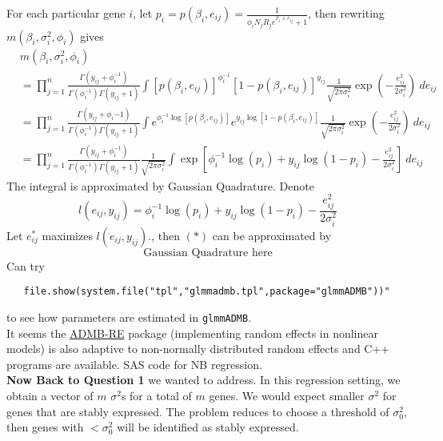 \documentclass[paper=a4, fontsize=12.5pt]{scrartcl} %
\numberwithin{equation}{section} %
\numberwithin{figure}{section} %
\numberwithin{table}{section} %
\begin{document}
   For each particular gene $i$, let $p_{i} = p(\beta_i, e_{ij}) =\frac{1}{\phi_i N_jR_je^{\beta_i  + e_{ij}} + 1}$, then rewriting $m(\beta_i, \sigma^2_i, \phi_i)$ gives 
\begin{align*}
  & m(\beta_i, \sigma^2_i, \phi_i) \\
   &= \prod_{j=1}^n\frac{\Gamma(y_{ij}+ \phi_i^{-1})}{\Gamma(\phi_i^{-1})\Gamma(y_{ij} + 1)}\int [p(\beta_i, e_{ij})]^{\phi_i^{-1}}[1-p(\beta_i, e_{ij})]^{y_{ij}}\frac{1}{\sqrt{2\pi\sigma^2_i}}\exp\left(-\frac{e_{ij}^2}{2\sigma_i^2}\right)~de_{ij}  \\
   &= \prod_{j=1}^n\frac{\Gamma(y_{ij}+ \phi_i{-1})}{\Gamma(\phi_i^{-1})\Gamma(y_{ij} + 1)}\int e^{\phi_i^{-1}\log[p(\beta_i,e_{ij})]}e^{y_{ij}\log[1-p(\beta_i, e_{ij})]} \frac{1}{\sqrt{2\pi\sigma_i^2}}\exp\left(-\frac{e_{ij}^2}{2\sigma_i^2}\right)~de_{ij} \\ 
   & =\prod_{j=1}^n\frac{\Gamma(y_{ij}+ \phi_i^{-1})}{\Gamma(\phi_i^{-1})\Gamma(y_{ij} + 1)}\frac{1}{\sqrt{2\pi\sigma^2_i}}\int \exp\left[\phi_i^{-1}\log (p_{i}) + y_{ij}\log(1-p_{i}) - \frac{e_{ij}^2}{2\sigma_i^2}\right]~de_{ij}
\end{align*}
   The integral is approximated by Gaussian Quadrature. Denote
    $$l(e_{ij}, y_{ij})=\phi_i^{-1}\log(p_{i}) + y_{ij}\log(1-p_{i})-\frac{e_{ij}^2}{2\sigma_i^2}$$
   Let $e_{ij}^{\ast}$ maximizes $l(e_{ij}, y_{ij})$., then  $(\ast)$ can be approximated by 
   \[ \text{Gaussian Quadrature here}\]
   Can try
   \begin{verbatim}
   file.show(system.file("tpl","glmmadmb.tpl",package="glmmADMB"))" 
   \end{verbatim}
   to see how parameters are estimated in \verb"glmmADMB".\\
   It seems the \href{http://www.admb-project.org/documentation/manuals}{ADMB-RE} package (implementing random effects in nonlinear models) is also adaptive to non-normally distributed random effects and C++ programs are available. 
   SAS code for NB regression.\\
   
   \textbf{Now Back to Question 1} we wanted to address.  In this regression setting, we obtain a vector of $m$ $\sigma^2$s for a total of $m$ genes. We would expect smaller $\sigma^2$ for genes that are stably expressed. The problem reduces to choose a threshold of $\sigma^2_0$, then genes with $<\sigma^2_0$ will be identified as stably expressed. 
\end{document}
